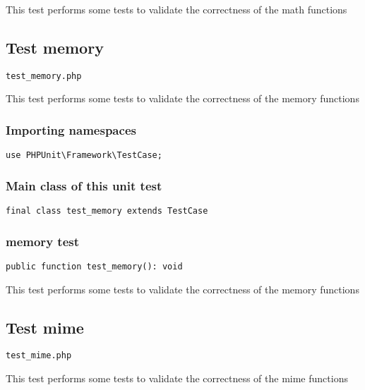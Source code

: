 \documentclass[a4paper]{article}
\begin{document}
This test performs some tests to validate the correctness
of the math functions

\hypertarget{toc263}{}
\subsection{Test memory}

\begin{lstlisting}
test_memory.php
\end{lstlisting}

This test performs some tests to validate the correctness
of the memory functions

\hypertarget{toc264}{}
\subsubsection{Importing namespaces}

\begin{lstlisting}
use PHPUnit\Framework\TestCase;
\end{lstlisting}

\hypertarget{toc265}{}
\subsubsection{Main class of this unit test}

\begin{lstlisting}
final class test_memory extends TestCase
\end{lstlisting}

\hypertarget{toc266}{}
\subsubsection{memory test}

\begin{lstlisting}
public function test_memory(): void
\end{lstlisting}

This test performs some tests to validate the correctness
of the memory functions

\hypertarget{toc267}{}
\subsection{Test mime}

\begin{lstlisting}
test_mime.php
\end{lstlisting}

This test performs some tests to validate the correctness
of the mime functions
\end{document}
